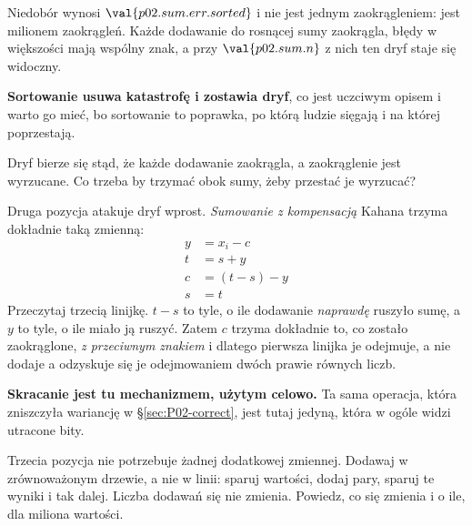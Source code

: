 \begin{fr}
Niedobór wynosi $\val{p02.sum.err.sorted}$ i nie jest jednym zaokrągleniem:
jest milionem zaokrągleń. Każde dodawanie do rosnącej sumy zaokrągla, błędy w
większości mają wspólny znak, a przy $\val{p02.sum.n}$ z nich ten dryf staje
się widoczny.

\textbf{Sortowanie usuwa katastrofę i zostawia dryf}, co jest uczciwym opisem i
warto go mieć, bo sortowanie to poprawka, po którą ludzie sięgają i na której
poprzestają.

Dryf bierze się stąd, że każde dodawanie zaokrągla, a zaokrąglenie jest
wyrzucane. Co trzeba by trzymać obok sumy, żeby przestać je wyrzucać?
\dotline
\nextframe
\end{fr}

\begin{fr}

Druga pozycja atakuje dryf wprost. \emph{Sumowanie z kompensacją} \dash{}
Kahana \dash{} trzyma dokładnie taką zmienną:
\begin{align*}
  y &= x_i - c \\
  t &= s + y \\
  c &= (t - s) - y \\
  s &= t
\end{align*}
Przeczytaj trzecią linijkę. $t - s$ to tyle, o ile dodawanie \emph{naprawdę}
ruszyło sumę, a $y$ to tyle, o ile miało ją ruszyć. Zatem $c$ trzyma dokładnie
to, co zostało zaokrąglone, \emph{z przeciwnym znakiem} \dash{} i dlatego
pierwsza linijka je odejmuje, a nie dodaje \dash{} a odzyskuje się je
odejmowaniem dwóch prawie równych liczb.

\textbf{Skracanie jest tu mechanizmem, użytym celowo.} Ta sama operacja, która
zniszczyła wariancję w \S\ref{sec:P02-correct}, jest tutaj jedyną, która w
ogóle widzi utracone bity.

Trzecia pozycja nie potrzebuje żadnej dodatkowej zmiennej. Dodawaj w
zrównoważonym drzewie, a nie w linii: sparuj wartości, dodaj pary, sparuj te
wyniki i tak dalej. Liczba dodawań się nie zmienia. Powiedz, co się zmienia i
o ile, dla miliona wartości.
\dotline
\nextframe
\end{fr}

